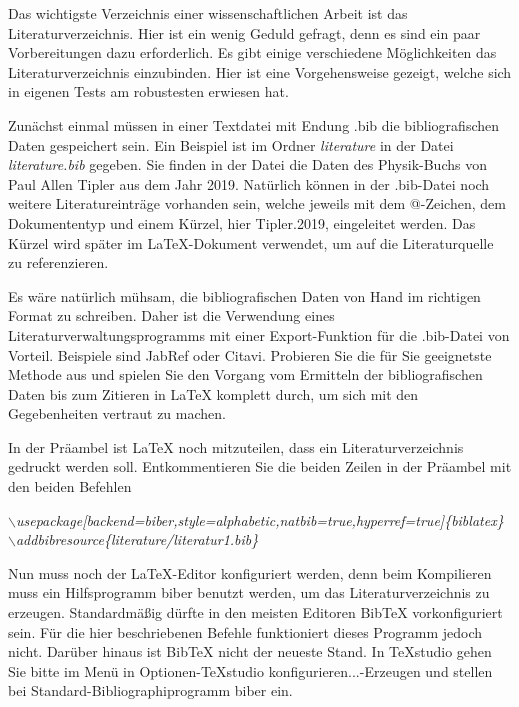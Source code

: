 \documentclass[ngerman,parskip]{scrbook}
\begin{document}
Das wichtigste Verzeichnis einer wissenschaftlichen Arbeit ist das
Literaturverzeichnis. Hier ist ein wenig Geduld gefragt, denn es sind ein paar
Vorbereitungen dazu erforderlich. Es gibt einige verschiedene Möglichkeiten das
Literaturverzeichnis einzubinden. Hier ist eine Vorgehensweise gezeigt, welche
sich in eigenen Tests am robustesten erwiesen hat.

Zunächst einmal müssen in einer Textdatei mit Endung .bib die bibliografischen
Daten gespeichert sein. Ein Beispiel ist im Ordner \textit{literature} in der
Datei \textit{literature.bib} gegeben. Sie finden in der Datei die Daten des
Physik-Buchs von Paul Allen Tipler aus dem Jahr 2019. Natürlich können in der
.bib-Datei noch weitere Literatureinträge vorhanden sein, welche jeweils mit
dem {@}-Zeichen, dem Dokumententyp und einem Kürzel, hier \glqq
Tipler.2019\grqq , eingeleitet werden. Das Kürzel wird später im
\LaTeX-Dokument verwendet, um auf die Literaturquelle zu referenzieren.

Es wäre natürlich mühsam, die bibliografischen Daten von Hand im richtigen
Format zu schreiben. Daher ist die Verwendung eines
Literaturverwaltungsprogramms mit einer Export-Funktion für die .bib-Datei von
Vorteil. Beispiele sind JabRef oder Citavi. Probieren Sie die für Sie
geeignetste Methode aus und spielen Sie den Vorgang vom Ermitteln der
bibliografischen Daten bis zum Zitieren in \LaTeX\; komplett durch, um sich mit
den Gegebenheiten vertraut zu machen.

In der Präambel ist \LaTeX\; noch mitzuteilen, dass ein Literaturverzeichnis gedruckt werden soll. Entkommentieren Sie die beiden Zeilen in der Präambel mit den beiden Befehlen

\textit{$\backslash$usepackage[backend=biber,style=alphabetic,natbib=true,hyperref=true]\{biblatex\}}\\
\textit{$\backslash$addbibresource\{literature/literatur1.bib\}}
%

Nun muss noch der \LaTeX-Editor konfiguriert werden, denn beim Kompilieren muss
ein Hilfsprogramm \glqq biber\grqq\; benutzt werden, um das
Literaturverzeichnis zu erzeugen. Standardmäßig dürfte in den meisten Editoren
\glqq BibTeX\grqq\; vorkonfiguriert sein. Für die hier beschriebenen Befehle
funktioniert dieses Programm jedoch nicht. Darüber hinaus ist \glqq
BibTeX\grqq\; nicht der neueste Stand. In TeXstudio gehen Sie bitte im Menü in
Optionen-TeXstudio konfigurieren...-Erzeugen und stellen bei
Standard-Bibliographiprogramm \glqq biber\grqq\; ein.
\end{document}
